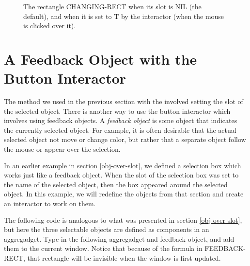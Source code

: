 \begin{figure}
\begin{center}
\end{center}
\caption{The rectangle CHANGING-RECT when its  slot is NIL
(the default), and when it is set to T by the interactor (when the
mouse is clicked over it).}
\end{figure}


\section{A Feedback Object with the Button Interactor}
\label{button-feed}

The method we used in the previous section with the
 involved setting the  slot of the
selected object.  There is another way to use the button interactor
which involves using feedback objects.  A {\it feedback object} is some
object that indicates the currently selected object.  For example, it is
often desirable that the actual selected object not move or change
color, but rather that a separate object follow the mouse or appear
over the selection.

In an earlier example in section \ref{obj-over-slot}, we defined a
selection box which works just like a feedback object.  When the
 slot of the selection box was set to the name of the
selected object, then the box appeared around the selected object.  In this
example, we will redefine the objects from that section and create an
interactor to work on them.

The following code is analogous to what was presented in section
\ref{obj-over-slot}, but here the three selectable objects are defined as
components in an aggregadget.  Type in the following aggregadget and
feedback object, and add them to the current window.  Notice that
because of the  formula in FEEDBACK-RECT, that rectangle
will be invisible when the window is first updated.

